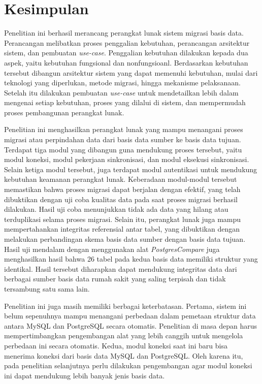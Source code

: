 \section{Kesimpulan}
\label{sec:kesimpulan}


Penelitian ini berhasil merancang perangkat lunak sistem migrasi basis data. Perancangan melibatkan proses penggalian kebutuhan, perancangan arsitektur sistem, 
dan pembuatan \emph{use-case}. Penggalian kebutuhan dilakukan kepada dua aspek, yaitu kebutuhan fungsional dan nonfungsioanl. Berdasarkan kebutuhan tersebut dibangun
arsitektur sistem yang dapat memenuhi kebutuhan, mulai dari teknologi yang diperlukan, metode migrasi, hingga mekanisme pelaksanaan. Setelah itu dilakukan pembuatan \emph{use-case}
untuk mendetailkan lebih dalam mengenai setiap kebutuhan, proses yang dilalui di sistem, dan mempermudah proses pembangunan perangkat lunak.

Penelitian ini menghasilkan perangkat lunak yang mampu menangani proses migrasi atau perpindahan data dari basis data sumber ke basis data tujuan. Terdapat tiga modul yang dibangun guna mendukung proses tersebut, yaitu modul koneksi, modul pekerjaan sinkronisasi, dan modul eksekusi sinkronisasi. Selain ketiga modul tersebut, juga terdapat modul autentikasi untuk mendukung kebutuhan keamanan perangkat lunak. Keberadaan modul-modul tersebut memastikan bahwa proses migrasi dapat berjalan dengan efektif, yang telah dibuktikan dengan uji coba kualitas data pada saat proses migrasi berhasil dilakukan. Hasil uji coba menunjukkan tidak ada data yang hilang atau terduplikasi selama proses migrasi. Selain itu, perangkat lunak juga mampu mempertahankan integritas referensial antar tabel, yang dibuktikan dengan melakukan perbandingan skema basis data sumber dengan basis data tujuan. Hasil uji mendalam dengan menggunakan alat \emph{PostgresCompare} juga menghasilkan hasil bahwa 26 tabel pada kedua basis data memiliki struktur yang identikal. Hasil tersebut diharapkan dapat mendukung integritas data dari berbagai sumber basis data rumah sakit yang saling terpisah dan tidak tersambung satu sama lain.

Penelitian ini juga masih memiliki berbagai keterbatasan. Pertama, sistem ini belum sepenuhnya mampu menangani perbedaan dalam pemetaan struktur data antara MySQL dan PostgreSQL secara otomatis. Penelitian di masa depan harus mempertimbangkan pengembangan alat yang lebih canggih untuk mengelola perbedaan ini secara otomatis. Kedua, modul koneksi saat ini baru bisa menerima koneksi dari basis data MySQL dan PostgreSQL. Oleh karena itu, pada penelitian selanjutnya perlu dilakukan pengembangan agar modul koneksi ini dapat mendukung lebih banyak jenis basis data.



